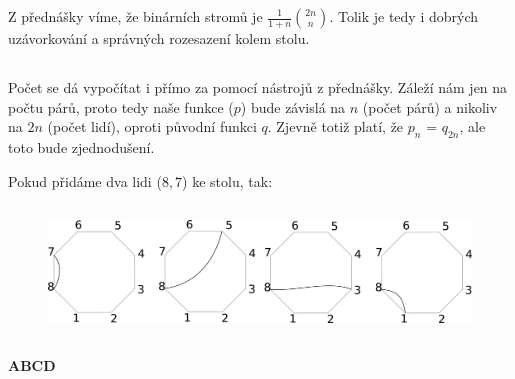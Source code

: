 \documentclass[a4paper]{article}
\begin{document}
Z přednášky víme, že binárních stromů je $\frac{1}{1+n} {2n \choose n} $. Tolik je tedy i dobrých uzávorkování a správných rozesazení kolem stolu.
 
\subsection{}
Počet se dá vypočítat i přímo za pomocí nástrojů z přednášky. Záleží nám jen na počtu párů, proto tedy naše funkce ($p$) bude závislá na $n$ (počet párů) a nikoliv na $2n$ (počet lidí), oproti původní funkci $q$. Zjevně totiž platí, že $p_n$ = $q_{2n}$, ale toto bude zjednodušení.

Pokud přidáme dva lidi ($8, 7$) ke stolu, tak:

\begin{figure}[h]
	\centering \hspace{4cm}
	\includegraphics[height=3.5cm]{seating_2}
\end{figure}
\hspace{3cm}\textbf{A}\hspace{3.2cm}\textbf{B}\hspace{3.2cm}\textbf{C}\hspace{3.2cm}\textbf{D}
\end{document}
